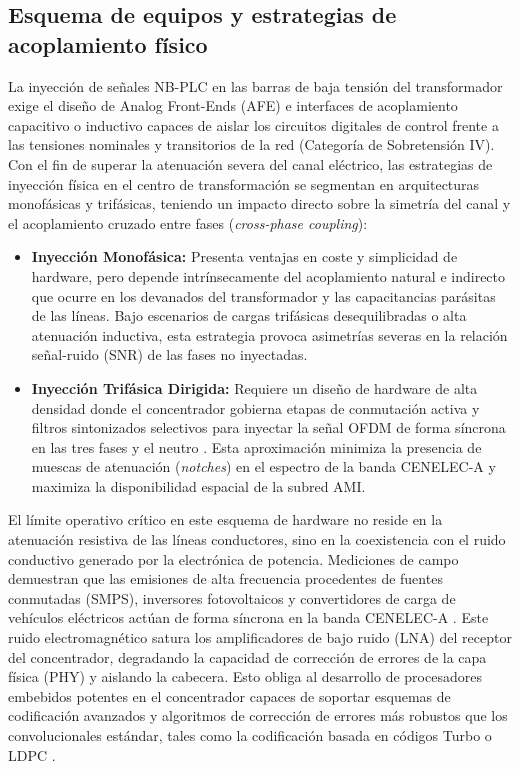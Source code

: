 \subsection{Esquema de equipos y estrategias de acoplamiento físico}
\label{subsec:acoplamiento_PLC}
La inyección de señales NB-PLC en las barras de baja tensión del transformador exige el diseño de Analog Front-Ends (AFE) e interfaces de acoplamiento capacitivo o inductivo capaces de aislar los circuitos digitales de control frente a las tensiones nominales y transitorios de la red (Categoría de Sobretensión IV). Con el fin de superar la atenuación severa del canal eléctrico, las estrategias de inyección física en el centro de transformación se segmentan en arquitecturas monofásicas y trifásicas, teniendo un impacto directo sobre la simetría del canal y el acoplamiento cruzado entre fases (\textit{cross-phase coupling}):
\begin{itemize}
    \item \textbf{Inyección Monofásica:} Presenta ventajas en coste y simplicidad de hardware, pero depende intrínsecamente del acoplamiento natural e indirecto que ocurre en los devanados del transformador y las capacitancias parásitas de las líneas. Bajo escenarios de cargas trifásicas desequilibradas o alta atenuación inductiva, esta estrategia provoca asimetrías severas en la relación señal-ruido (SNR) de las fases no inyectadas.
    \item \textbf{Inyección Trifásica Dirigida:} Requiere un diseño de hardware de alta densidad donde el concentrador gobierna etapas de conmutación activa y filtros sintonizados selectivos para inyectar la señal OFDM de forma síncrona en las tres fases y el neutro \cite{5764420}. Esta aproximación minimiza la presencia de muescas de atenuación (\textit{notches}) en el espectro de la banda CENELEC-A y maximiza la disponibilidad espacial de la subred AMI.
\end{itemize}

El límite operativo crítico en este esquema de hardware no reside en la atenuación resistiva de las líneas conductores, sino en la coexistencia con el ruido conductivo generado por la electrónica de potencia. Mediciones de campo demuestran que las emisiones de alta frecuencia procedentes de fuentes conmutadas (SMPS), inversores fotovoltaicos y convertidores de carga de vehículos eléctricos actúan de forma síncrona en la banda CENELEC-A \cite{10104173}. Este ruido electromagnético satura los amplificadores de bajo ruido (LNA) del receptor del concentrador, degradando la capacidad de corrección de errores de la capa física (PHY) y aislando la cabecera. Esto obliga al desarrollo de procesadores embebidos potentes en el concentrador capaces de soportar esquemas de codificación avanzados y algoritmos de corrección de errores más robustos que los convolucionales estándar, tales como la codificación basada en códigos Turbo o LDPC \cite{9441595,9820886}.


